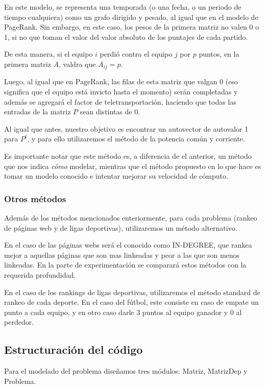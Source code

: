 En este modelo, se representa una temporada (o una fecha, o un periodo de tiempo cualquiera) como un grafo dirigido y pesado, al igual que en el modelo de PageRank. Sin embargo, en este caso, los pesos de la primera matriz no valen 0 o 1, si no que toman el valor del valor absoluto de los puntajes de cada partido.

De esta manera, si el equipo $i$ perdió contra el equipo $j$ por $p$ puntos, en la primera matriz $A$, valdra que $A_{ij} = p$. 

Luego, al igual que en PageRank, las filas de esta matriz que valgan 0 (eso significa que el equipo está invicto hasta el momento) serán completadas y además se agregará el factor de teletransportación, haciendo que todas las entradas de la matriz $P$ sean distintas de 0.

Al igual que antes, nuestro objetivo es encontrar un autovector de autovalor 1 para $P^t$, y para ello utilizaremos el método de la potencia común y corriente.

Es importante notar que este m\'etodo es, a diferencia de el anterior, un m\'etodo que nos indica \emph{cómo} modelar, mientras que el m\'etodo propuesto en \cite{Kamvar2003} lo que hace es tomar un modelo conocido e intentar mejorar su velocidad de cómputo.

\subsubsection{Otros m\'etodos}

Además de los m\'etodos mencionados enteriormente, para cada problema (rankeo de páginas web y de ligas deportivas), utilizaremos un m\'etodo alternativo. 

En el caso de las páginas webs será el conocido como IN-DEGREE, que rankea mejor a aquellas páginas que son mas linkeadas y peor a las que son menos linkeadas. En la parte de experimentación se comparará estos m\'etodos con la requerida profundidad.

En el caso de los rankings de ligas deportivas, utilizaremos el m\'etodo standard de rankeo de cada deporte. En el caso del fútbol, este consiste en caso de empate un punto a cada equipo, y en otro caso darle 3 puntos al equipo ganador y 0 al perdedor.


\subsection{Estructuración del código}
Para el modelado del problema diseñamos tres módulos: Matriz, MatrizDep y Problema. 


